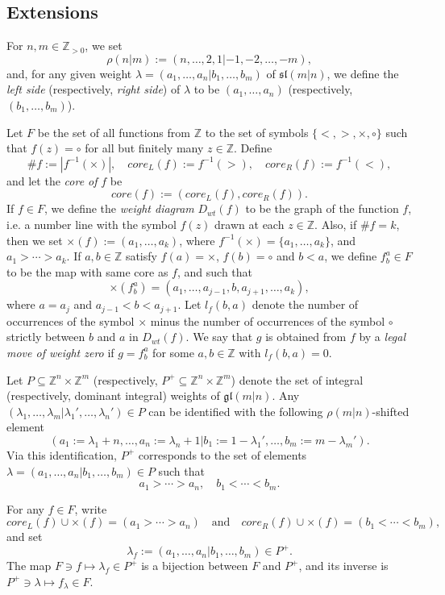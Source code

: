\documentclass[12pt]{amsart}
\newcommand\Z{\mathbb{Z}}
\newcommand\fsl{\mathfrak{sl}}
\newcommand\fgl{\mathfrak{gl}}
\theoremstyle{plain}
\theoremstyle{definition}
\numberwithin{equation}{section}
\begin{document}
\subsection*{Extensions}\label{sec:extensions}
For $n,m\in \Z_{>0}$, we set 
	\[
\rho(n|m) := (n,\ldots, 2,1 | -1,-2,\ldots, -m),
	\]
and, for any given weight $\lambda = (a_1,\ldots, a_n | b_1,\ldots, b_m)$ of $\fsl(m|n)$, we define the \emph{left side} (respectively, \emph{right side}) of $\lambda$ to be $(a_1,\ldots, a_n)$ (respectively, $(b_1,\ldots, b_m)$). 

Let $F$ be the set of all functions from $\Z$ to the set of symbols $\{<,>,\times, \circ\}$ such that $f(z) = \circ$ for all but finitely many $z\in \Z$. Define 
	\[
\#f := |f^{-1}(\times )|,\quad core_L(f) := f^{-1}(>),\quad core_R (f) := f^{-1}(<),
	\]
and let the \emph{core of} $f$ be
	\[
core(f) := (core_L(f), core_R(f)).
	\]
If $f\in F$, we define the \emph{weight diagram} $D_{wt}(f)$ to be the graph of the function $f$, i.e. a number line with the symbol $f(z)$ drawn at each $z\in \Z$. Also, if $\#f = k$, then we set $\times (f):= (a_1,\ldots, a_k)$, where $f^{-1}(\times) = \{a_1,\ldots, a_k\}$, and $a_1>\cdots>a_k$. If $a,b\in \Z$ satisfy $f(a)=\times$, $f(b) = \circ$ and $b<a$, we define $f_b^a\in F$ to be the map with same core as $f$, and such that
	\[
\times (f_b^a) = (a_1,\ldots,a_{j-1}, b, a_{j+1},\ldots, a_k),
	\]
where $a = a_j$ and $a_{j-1}<b<a_{j+1}$. Let $l_f(b,a)$ denote the number of occurrences of the symbol $\times$ minus the number of occurrences of the symbol $\circ$ strictly between $b$ and $a$ in $D_{wt}(f)$. We say that $g$ is obtained from $f$ by a \emph{legal move of weight zero} if $g = f_b^a$ for some $a,b\in \Z$ with $l_f(b,a)=0$.

Let $P\subseteq \Z^n\times \Z^m$ (respectively, $P^+\subseteq \Z^n\times \Z^m$) denote the set of integral (respectively, dominant integral) weights of $\fgl(m|n)$. Any $(\lambda_1,\ldots, \lambda_m | \lambda_1',\ldots, \lambda_n')\in P$ can be identified with the following $\rho(m|n)$-shifted element
	\[
(a_1:=\lambda_1+n,\ldots, a_n:=\lambda_n+1 | b_1:= 1 - \lambda_1',\ldots, b_m:= m - \lambda_m').
	\]
Via this identification, $P^+$ corresponds to the set of elements $\lambda = (a_1,\ldots, a_n | b_1,\ldots, b_m)\in P$ such that
	\[
a_1>\cdots>a_n,\quad b_1<\cdots<b_m.
	\]

For any $f\in F$, write
	\[
core_L(f) \cup \times (f) = (a_1>\cdots >a_n)\quad \text{and} \quad core_R(f) \cup \times (f) = (b_1<\cdots <b_m),
	\]
and set
	\[
\lambda_f := (a_1,\ldots, a_n | b_1,\ldots, b_m)\in P^+.
	\]
The map $F\ni f \mapsto \lambda_f\in P^+$ is a bijection between $F$ and $P^+$, and its inverse is $P^+\ni \lambda \mapsto f_\lambda\in F$.
\end{document}

